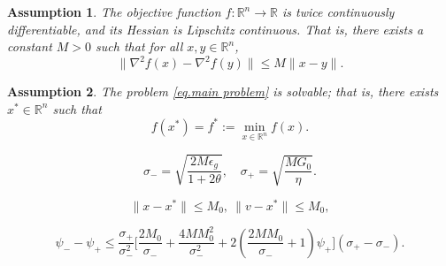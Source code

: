 \documentclass[10pt,a4paper]{amsart}
\newtheorem{assumption}{Assumption}
\begin{document}
\begin{assumption}
    \label{assm.lipschitz}
    The objective function $f: \mathbb{R}^n \to \mathbb{R}$ is twice continuously differentiable, and its Hessian is Lipschitz continuous. That is, there exists a constant $M > 0$ such that for all $x, y \in \mathbb{R}^n$,
    \begin{equation}
        \label{eq.main assm}
        \|\nabla^2 f(x) - \nabla^2 f(y)\| \leq M \|x - y\|. \end{equation}
\end{assumption}

\begin{assumption}
    \label{assm.solvable}
    The problem \eqref{eq.main problem} is solvable; that is, there exists $x^* \in \mathbb{R}^n$ such that
    \begin{equation*}
        f(x^*) = f^*:= \min_{x \in \mathbb{R}^n} f(x).
    \end{equation*}
\end{assumption}

    \begin{equation}
        \label{eq.bracket points}
        \sigma_- = \sqrt{\frac{2M\epsilon_g}{1+2\theta}}, \quad \sigma_+ = \sqrt{\frac{MG_0}{\eta}}.
    \end{equation}

    \begin{equation}\label{eq.bounded assm point}
        \|x-x^*\|\leq M_0, \ \|v-x^*\|\leq M_0,
    \end{equation}

    \begin{equation}
        \label{eq.bounded gap bisection sigma}
        \psi_- - \psi_+
        \leq
        \frac{\sigma_+}{\sigma_-^2}
        \Bigg[
            \frac{2M_0}{\sigma_-}
            +
            \frac{4MM_0^2}{\sigma_-^2}
            +
            2\left(
            \frac{2MM_0}{\sigma_-}+1
            \right)\psi_+
            \Bigg]
        (\sigma_+-\sigma_-).
    \end{equation}
\end{document}
